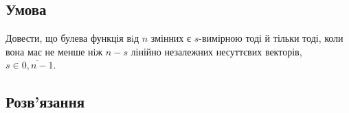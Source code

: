 \chapter{}
\label{chap:1}

\section{Умова}

Довести, що булева функція вiд $n$ змінних є $s$-вимірною тоді й тільки тоді, коли вона має не менше нiж $n - s$
лінійно незалежних несуттєвих векторів, $s \in \overline{0, n - 1}$.

\section{Розв'язання}

